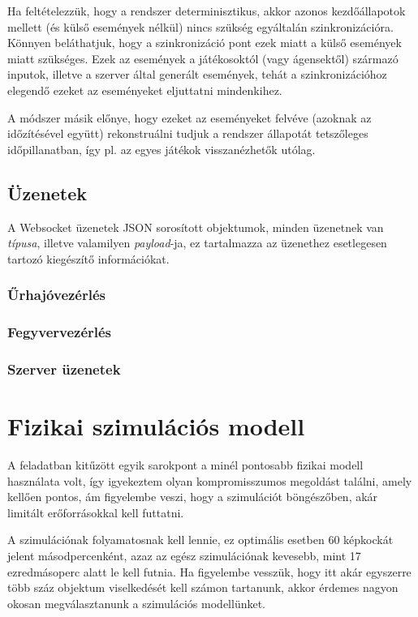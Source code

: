 Ha feltételezzük, hogy a rendszer determinisztikus, akkor azonos kezdőállapotok
mellett (és külső események nélkül) nincs szükség egyáltalán szinkronizációra.
Könnyen beláthatjuk, hogy a szinkronizáció pont ezek miatt a külső események
miatt szükséges. Ezek az események a játékosoktól (vagy ágensektől) származó
inputok, illetve a szerver által generált események, tehát a szinkronizációhoz
elegendő ezeket az eseményeket eljuttatni mindenkihez.

A módszer másik előnye, hogy ezeket az eseményeket felvéve (azoknak az
időzítésével együtt) rekonstruálni tudjuk a rendszer állapotát tetszőleges
időpillanatban, így pl. az egyes játékok visszanézhetők utólag.

\subsection{Üzenetek}

A Websocket üzenetek JSON sorosított objektumok, minden üzenetnek van
\emph{típusa}, illetve valamilyen \emph{payload}-ja, ez tartalmazza az üzenethez
esetlegesen tartozó kiegészítő információkat.

\subsubsection{Űrhajóvezérlés}

\subsubsection{Fegyvervezérlés}

\subsubsection{Szerver üzenetek}

\section{Fizikai szimulációs modell}

A feladatban kitűzött egyik sarokpont a minél pontosabb fizikai modell
használata volt, így igyekeztem olyan kompromisszumos megoldást találni, amely
kellően pontos, ám figyelembe veszi, hogy a szimulációt böngészőben, akár
limitált erőforrásokkal kell futtatni.

A szimulációnak folyamatosnak kell lennie, ez optimális esetben 60 képkockát
jelent másodpercenként, azaz az egész szimulációnak kevesebb, mint 17
ezredmásoperc alatt le kell futnia.  Ha figyelembe vesszük, hogy itt akár
egyszerre több száz objektum viselkedését kell számon tartanunk, akkor érdemes
nagyon okosan megválasztanunk a szimulációs modellünket.

